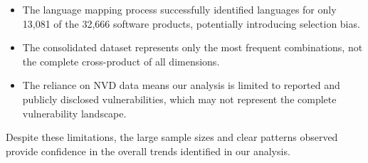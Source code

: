 \begin{itemize}
    \item The language mapping process successfully identified languages for only 13,081 of the 32,666 software products, potentially introducing selection bias.
    \item The consolidated dataset represents only the most frequent combinations, not the complete cross-product of all dimensions.
    \item The reliance on NVD data means our analysis is limited to reported and publicly disclosed vulnerabilities, which may not represent the complete vulnerability landscape.
\end{itemize}

Despite these limitations, the large sample sizes and clear patterns observed provide confidence in the overall trends identified in our analysis.
